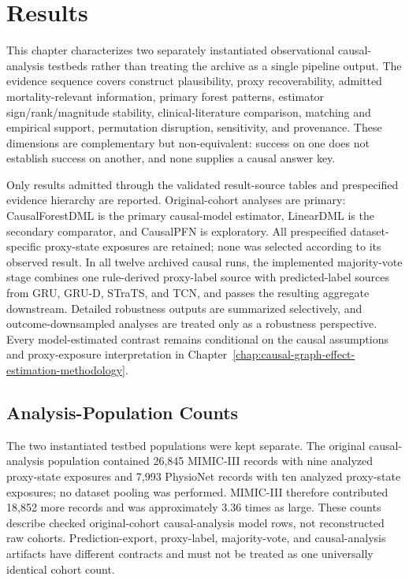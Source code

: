 \chapter{Results}
\label{chap:results}

This chapter characterizes two separately instantiated observational causal-analysis testbeds rather than treating the archive as a single pipeline output.  The evidence sequence covers construct plausibility, proxy recoverability, admitted mortality-relevant information, primary forest patterns, estimator sign/rank/magnitude stability, clinical-literature comparison, matching and empirical support, permutation disruption, sensitivity, and provenance.  These dimensions are complementary but non-equivalent: success on one does not establish success on another, and none supplies a causal answer key.

Only results admitted through the validated result-source tables and prespecified evidence hierarchy are reported.  Original-cohort analyses are primary: CausalForestDML is the primary causal-model estimator, LinearDML is the secondary comparator, and CausalPFN is exploratory.  All prespecified dataset-specific proxy-state exposures are retained; none was selected according to its observed result.  In all twelve archived causal runs, the implemented majority-vote stage combines one rule-derived proxy-label source with predicted-label sources from GRU, GRU-D, STraTS, and TCN, and passes the resulting aggregate downstream.  Detailed robustness outputs are summarized selectively, and outcome-downsampled analyses are treated only as a robustness perspective.  Every model-estimated contrast remains conditional on the causal assumptions and proxy-exposure interpretation in Chapter~\ref{chap:causal-graph-effect-estimation-methodology}.

\section{Analysis-Population Counts}
\label{sec:results:analysis-population-counts}

The two instantiated testbed populations were kept separate.  The original causal-analysis population contained 26,845 MIMIC-III records with nine analyzed proxy-state exposures and 7,993 PhysioNet records with ten analyzed proxy-state exposures; no dataset pooling was performed.  MIMIC-III therefore contributed 18,852 more records and was approximately 3.36 times as large.  These counts describe checked original-cohort causal-analysis model rows, not reconstructed raw cohorts.  Prediction-export, proxy-label, majority-vote, and causal-analysis artifacts have different contracts and must not be treated as one universally identical cohort count.

